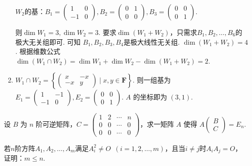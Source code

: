 \begin{exercise}
\begin{exgroup}
\begin{answer}
\begin{enumerate}
                    $W_2$的基：$B_1=\begin{pmatrix}1&0\\-1&0\end{pmatrix},B_2=\begin{pmatrix}0&1\\0&0\end{pmatrix},B_3=\begin{pmatrix}0&0\\0&1\end{pmatrix}$.

                    则$\dim W_1=3,\dim W_2=3$. 要求$\dim  (W_1+W_2)$，只需求$B_1,B_2,\ldots ,B_6$的极大无关组即可. 可知 $B_1,B_2,B_3,B_4$是极大线性无关组.	$\dim(W_1+W_2)=4$. 根据维数公式$\dim (W_1\cap W_2)=\dim W_1+\dim W_2-\dim (W_1+W_2)=2$.

                \item $W_1\cap W_2=\left\{\begin{pmatrix}x&-x\\-x&y\end{pmatrix} \mid x,y\in \mathbf{F}\right\}$. 则一组基为$E_1=\begin{pmatrix}1&-1\\-1&0\end{pmatrix},E_2=\begin{pmatrix}0&0\\0&1\end{pmatrix}$. $A$ 的坐标即为 $(3,1)$.
            \end{enumerate}
        \end{answer}

        \item 设 $B$ 为 $n$ 阶可逆矩阵，$C = \begin{pmatrix}
            1 & 2 & \cdots & n \\
            0 & 0 & \cdots & 0 \\
            0 & 0 & \cdots & 0
        \end{pmatrix}$，求一矩阵 $A$ 使得 $A\begin{pmatrix}
            B \\ C
        \end{pmatrix} = E_n$.
        \begin{answer}

        \end{answer}
    \end{exgroup}

    \begin{exgroup}
        \item 若$n$阶方阵$A_1,A_2,\ldots,A_m$满足$A_i^2\neq O\enspace(i=1,2,\ldots,m)$，且当$i\neq j$时$A_iA_j=O$，证明：$m\leqslant n$.
        \begin{answer}
            

\end{answer}
\end{exgroup}
\end{exercise}
